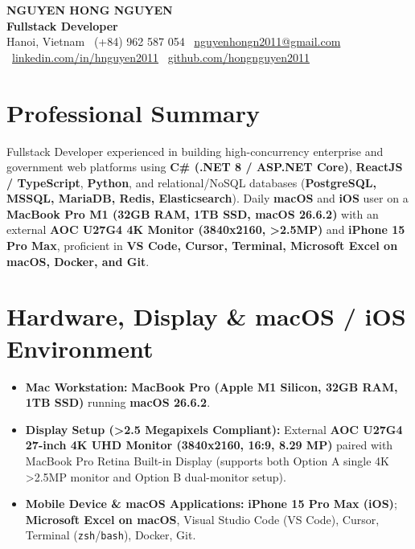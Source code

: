 \documentclass[a4paper,10pt]{article}
\begin{document}
\fontsize{8.9pt}{10.4pt}\selectfont
\color{textdark}

\begin{center}
    {\fontsize{15pt}{17pt}\selectfont\bfseries\color{primary} NGUYEN HONG NGUYEN}\\[1pt]
    {\fontsize{10.5pt}{12pt}\selectfont\bfseries Fullstack Developer}\\[1.5pt]
    {\fontsize{8.5pt}{10pt}\selectfont
    Hanoi, Vietnam \textbar\ (+84) 962 587 054 \textbar\ \href{mailto:nguyenhongn2011@gmail.com}{nguyenhongn2011@gmail.com} \textbar\ \href{https://www.linkedin.com/in/hnguyen2011/}{linkedin.com/in/hnguyen2011} \textbar\ \href{https://github.com/hongnguyen2011}{github.com/hongnguyen2011}}
\end{center}

\vspace{-7pt}

\section{Professional Summary}
Fullstack Developer experienced in building high-concurrency enterprise and government web platforms using \textbf{C\# (.NET 8 / ASP.NET Core)}, \textbf{ReactJS / TypeScript}, \textbf{Python}, and relational/NoSQL databases (\textbf{PostgreSQL, MSSQL, MariaDB, Redis, Elasticsearch}). Daily \textbf{macOS} and \textbf{iOS} user on a \textbf{MacBook Pro M1 (32GB RAM, 1TB SSD, macOS 26.6.2)} with an external \textbf{AOC U27G4 4K Monitor (3840x2160, \textgreater 2.5MP)} and \textbf{iPhone 15 Pro Max}, proficient in \textbf{VS Code, Cursor, Terminal, Microsoft Excel on macOS, Docker, and Git}.

\section{Hardware, Display \& macOS / iOS Environment}
\begin{itemize}
    \item \textbf{Mac Workstation:} \textbf{MacBook Pro (Apple M1 Silicon, 32GB RAM, 1TB SSD)} running \textbf{macOS 26.6.2}.
    \item \textbf{Display Setup (\textgreater 2.5 Megapixels Compliant):} External \textbf{AOC U27G4 27-inch 4K UHD Monitor (3840x2160, 16:9, 8.29 MP)} paired with MacBook Pro Retina Built-in Display (supports both Option A single 4K \textgreater 2.5MP monitor and Option B dual-monitor setup).
    \item \textbf{Mobile Device \& macOS Applications:} \textbf{iPhone 15 Pro Max (iOS)}; \textbf{Microsoft Excel on macOS}, Visual Studio Code (VS Code), Cursor, Terminal (\texttt{zsh}/\texttt{bash}), Docker, Git.
\end{itemize}
\end{document}
